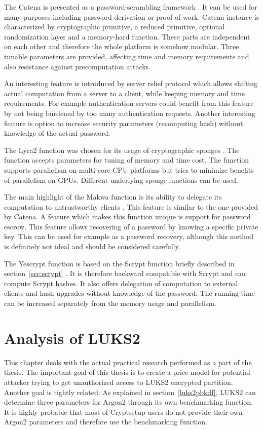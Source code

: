 \documentclass[nolof]{fithesis3}
\begin{document}
The Catena is presented as a password-scrambling framework \parencite{catena}. It can be used for many purposes including password derivation or proof of work. Catena instance is characterized by cryptographic primitive, a reduced primitive, optional randomization layer and a memory-hard function. These parts are independent on each other and therefore the whole platform is somehow modular. Three tunable parameters are provided, affecting time and memory requirements and also resistance against precomputation attacks.

An interesting feature is introduced by server relief protocol which allows shifting actual computation from a server to a client, while keeping memory and time requirements. For example authentication servers could benefit from this feature by not being burdened by too many authentication requests. Another interesting feature is option to increase security parameters (recomputing hash) without knowledge of the actual password.

The Lyra2 function was chosen for its usage of cryptographic sponges \parencite{lyra2}. The function accepts parameters for tuning of memory and time cost. The function supports parallelism on multi-core CPU platforms but tries to minimize benefits of parallelism on GPUs. Different underlying sponge functions can be used.

The main highlight of the Makwa function is its ability to delegate its computation to untrustworthy clients \parencite{maqa}. This feature is similar to the one provided by Catena. A feature which makes this function unique is support for password escrow. This feature allows recovering of a password by knowing a specific private key. This can be used for example as a password recovery, although this method is definitely not ideal and should be considered carefully.

The Yescrypt function is based on the Scrypt function briefly described in section~\ref{sec:scrypt} \parencite{yescrypt}. It is therefore backward compatible with Scrypt and can compute Scrypt hashes. It also offers delegation of computation to external clients and hash upgrades without knowledge of the password. The running time can be increased separately from the memory usage and parallelism.

\chapter{Analysis of LUKS2}
\label{chap:analysis}
This chapter deals with the actual practical research performed as a part of the thesis. The important goal of this thesis is to create a price model for potential attacker trying to get unauthorized access to LUKS2 encrypted partition. Another goal is tightly related. As explained in section~\ref{luks2pbkdf}, LUKS2 can determine three parameters for Argon2 through its own benchmarking function. It is highly probable that most of Cryptsetup users do not provide their own Argon2 parameters and therefore use the benchmarking function.
\end{document}
